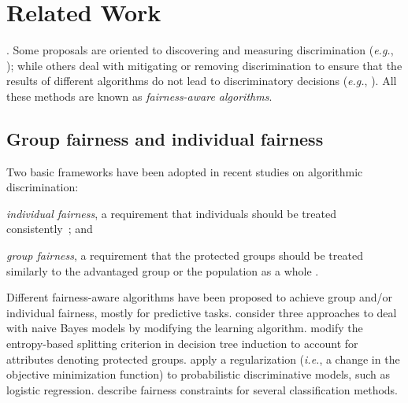 \section{Related Work}\label{sec:related-work}

\cite{tuto2016,rosenbaum2019algorithmic}. Some proposals are oriented to discovering and measuring discrimination ({\em e.g.}, \cite{peder2008,Bonchi2015,angwin_2016_machine}); while others deal with mitigating or removing discrimination to ensure that the results of different algorithms do not lead to discriminatory decisions
({\em e.g.}, \cite{CaldersICDM,HajianFerrer12,hajian2014,Dwork2012,Zemel2013}).
%
All these methods are known as \emph{fairness-aware algorithms}.

\subsection{Group fairness and individual fairness}
Two basic frameworks have been adopted in recent studies on algorithmic discrimination: \begin{inparaenum}[(i)]
	\item \emph{individual fairness}, a requirement that individuals should be treated consistently~\cite{Dwork2012, zliobaite2015survey}; and
	\item \emph{group fairness},  a requirement that the protected groups should be treated similarly to the advantaged group or the population as a whole \cite{peder2008,pederruggi2009}.
\end{inparaenum}

Different fairness-aware algorithms have been proposed to achieve group and/or individual fairness, mostly for predictive tasks. \citet{Calders2010} consider three approaches to deal with naive Bayes models by modifying the learning algorithm.
\citet{CaldersICDM} modify the entropy-based splitting criterion in decision tree induction to account for attributes denoting protected groups.
\citet{Kamishima2012}  apply a regularization ({\em i.e.}, a
change in the objective minimization function) to probabilistic discriminative models, such
as logistic regression. \citet{zafar2015} describe fairness constraints for several classification methods.

